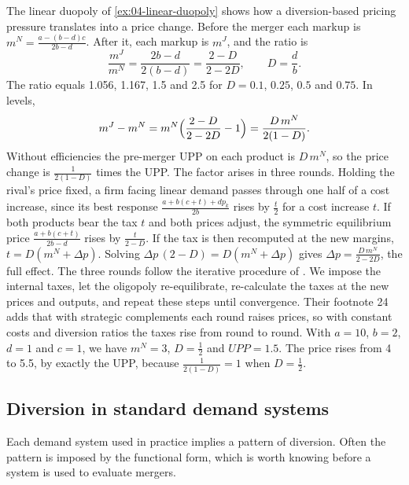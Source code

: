 \begin{example}\label{ex:04-upp-linear}
The linear duopoly of \cref{ex:04-linear-duopoly} shows how a diversion-based pricing pressure translates into a
price change. Before the merger each markup is $m^N = \frac{a - (b - d)c}{2b - d}$. After it, each markup is
$m^J$, and the ratio is
\[
  \frac{m^J}{m^N} = \frac{2b - d}{2(b - d)} = \frac{2 - D}{2 - 2D}, \qquad D = \frac{d}{b}.
\]
The ratio equals 1.056, 1.167, 1.5 and 2.5 for $D = 0.1$, $0.25$, $0.5$ and $0.75$. In levels,
\[
  m^J - m^N = m^N\Bigl(\frac{2 - D}{2 - 2D} - 1\Bigr) = \frac{D\,m^N}{2(1 - D)}.
\]
Without efficiencies the pre-merger UPP on each product is $D\,m^N$, so the price change is
$\frac{1}{2(1 - D)}$ times the UPP. The factor arises in three rounds. Holding the rival's price fixed, a firm
facing linear demand passes through one half of a cost increase, since its best response
$\frac{a + b(c + t) + d p_k}{2b}$ rises by $\frac{t}{2}$ for a cost increase $t$. If both products bear the
tax $t$ and both prices adjust, the symmetric equilibrium price $\frac{a + b(c + t)}{2b - d}$ rises by
$\frac{t}{2 - D}$. If the tax is then recomputed at the new margins, $t = D(m^N + \Delta p)$. Solving
$\Delta p\,(2 - D) = D(m^N + \Delta p)$ gives $\Delta p = \frac{D\,m^N}{2 - 2D}$, the full effect. The three
rounds follow the iterative procedure of \citet[p.~9]{FarrellShapiro2010}. We impose the internal taxes, let the
oligopoly re-equilibrate, re-calculate the taxes at the new prices and outputs, and repeat these steps until
convergence. Their footnote 24 adds that with strategic complements each round raises prices, so with constant
costs and diversion ratios the taxes rise from round to round. With $a = 10$, $b = 2$,
$d = 1$ and $c = 1$, we have $m^N = 3$, $D = \frac{1}{2}$ and $\mathit{UPP} = 1.5$. The price rises from 4 to
5.5, by exactly the UPP, because $\frac{1}{2(1 - D)} = 1$ when $D = \frac{1}{2}$.
\end{example}

\subsection{Diversion in standard demand systems}\label{sec:04-diversion-systems}

Each demand system used in practice implies a pattern of diversion. Often the pattern is imposed by the
functional form, which is worth knowing before a system is used to evaluate mergers.

